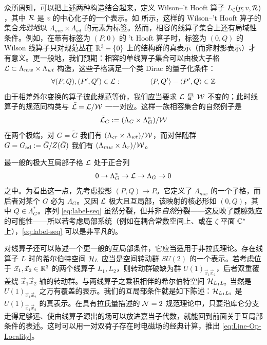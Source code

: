 众所周知，可以把上述两种构造结合起来，定义 Wilson–'t Hooft 算子 $L_\zeta(p;v,\mathcal{R})$，其中 $\mathcal{R}$ 是 $v$ 的中心化子的一个表示。如 \cite{Kapustin:2005py} 所示，这样的 Wilson–'t Hooft 算子的集合\emph{先验地}以 $\Lambda_{mw} \times \Lambda_{wt}$ 的元素为标签。然而，相容的线算子集合上还有局域性条件。例如，在带有标签为 $(P,0)$ 的 't Hooft 算子时，标签为 $(0,Q)$ 的 Wilson 线算子只对规范丛在 $\mathbb{R}^3- \{0 \}$ 上的结构群的真表示（而非射影表示）才有意义。更一般地，我们预期：相容的单线算子集合可以由极大子格 $\mathcal{L}\subset \Lambda_{mw} \times  \Lambda_{wt}$ 构造，这些子格满足一个类 Dirac 的量子化条件：
\begin{equation}\label{eq:Line-Op-Locality}
\forall (P,Q), (P',Q')\in \mathcal{L} : \qquad \qquad \langle P, Q' \rangle - \langle P' , Q \rangle \in \mathbb{Z}
\end{equation}
由于相差外尔变换的算子彼此规范等价，我们应当要求 $\mathcal{L}$ 是 $\mathcal{W}$ 不变的；此时线算子的规范同构类与 $\bar{\mathcal{L}}=\mathcal{L}/\mathcal{W}$ 一一对应。这样一族相容集合的自然例子是
\begin{equation}\label{eq:Wilson-tHooft-B}
\bar{\mathcal{L}}_G := (\Lambda_G \times \Lambda_G^*)/\mathcal{W}
\end{equation}
在两个极端，对 $G=\tilde G$ 我们有 $(\Lambda_{cr}\times \Lambda_{wt})/\mathcal{W}$，而对伴随群 $G = G_{\rm ad}:= \tilde G/Z(\tilde G)$ 我们有 $(\Lambda_{mw} \times \Lambda_{r})/\mathcal{W}$。

最一般的极大互局部子格 $\mathcal{L}$ 处于正合列
\begin{equation}\label{eq:label-seq}
0 \rightarrow \Lambda_G^* \rightarrow \mathcal{L} \rightarrow \Lambda_G  \rightarrow 0
\end{equation}
之中。为看出这一点，先考虑投影 $(P,Q) \to P$。它定义了 $\Lambda_{mw}$ 的一个子格，而后者对某个 $G$ 必为 $\Lambda_G$。又因 $\mathcal{L}$ 极大且互局部，该映射的核必形如 $(0,Q)$，其中 $Q \in \Lambda_G^*$。序列 \eqref{eq:label-seq} 虽然分裂，但并非\emph{自然}分裂——这反映了威滕效应的可能性——所以若考虑局部系统（例如在耦合常数空间上、或在 $\zeta$ 平面 $\mathbb{C}^*$ 上），\eqref{eq:label-seq} 可以是非平凡的。

对线算子还可以陈述一个更一般的互局部条件，它应当适用于非拉氏理论。存在线算子 $L$ 时的希尔伯特空间 $\mathcal{H}_L$ 应当是空间转动群 $SU(2)$ 的一个表示。若考虑位于 $\vec x_1, \vec x_2\in \mathbb{R}^3$ 的两个线算子 $L_1,L_2$，则转动群破缺为群 $U(1)_{\vec x_1 \vec x_2}$，后者双重覆盖绕 $\vec x_1 \vec x_2$ 轴的转动群。与两线算子之乘积相伴的希尔伯特空间 $\mathcal{H}_{L_1 L_2}$ 当然是 $U(1)_{\vec x_1 \vec x_2}$ 之万有覆盖的表示。我们的互局部条件就是如下陈述：$\mathcal{H}_{L_1 L_2}$ 是 $U(1)_{\vec x_1 \vec x_2}$ 的真表示。在具有拉氏量描述的 $\mathcal{N}=2$ 规范理论中，只要沿库仑分支走得足够远、使由线算子源出的场可以放进嘉当子代数，就能回到前面关于互局部条件的表述。这时可以用一对双荷子存在时电磁场的经典计算，推出 \eqref{eq:Line-Op-Locality}。

